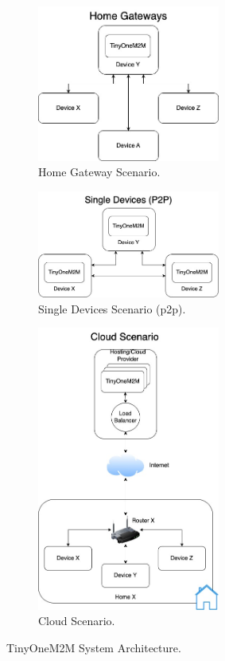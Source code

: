\documentclass[a4paper,fleqn]{cas-dc}
\begin{document}
\begin{figure}[htb]
     \centering
     \begin{subfigure}[h]{7cm}
         \centering
         \includegraphics[width=6cm]{HomeGatewaysScenario.jpg}
         \caption{Home Gateway Scenario.}
         \label{fig:hgw}
     \end{subfigure}
     \hfill
     \begin{subfigure}[h]{7cm}
         \centering
         \includegraphics[width=6cm]{SingleDevicesScenario.jpg}
         \caption{Single Devices Scenario (\gls{p2p}).}
         \label{fig:sdc}
     \end{subfigure}
     \hfill
     \begin{subfigure}[h]{7cm}
         \centering
         \includegraphics[width=6cm]{CloudScenario.jpg}
         \caption{Cloud Scenario.}
         \label{fig:cs}
     \end{subfigure}
     \caption{TinyOneM2M System Architecture.}
     \label{fig:scenarios}
\end{figure}
\end{document}
